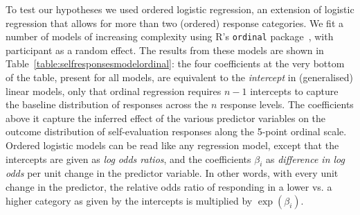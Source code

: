 To test our hypotheses we used ordered logistic regression, an extension of logistic regression that allows for more than two (ordered) response categories. We fit a number of models of increasing complexity using R's \texttt{ordinal} package~\citep{ordinal2015}, with participant as a random effect. %
The results from these models are shown in Table~\ref{table:selfresponsesmodelordinal}: the four coefficients at the very bottom of the table, present for all models, are equivalent to the \emph{intercept} in (generalised) linear models, only that ordinal regression requires $n-1$ intercepts to capture the baseline distribution of responses across the $n$ response levels. The coefficients above it capture the inferred effect of the various predictor variables on the outcome distribution of self-evaluation responses along the 5-point ordinal scale. Ordered logistic models can be read like any regression model, except that the intercepts are given as \emph{log odds ratios}, and the coefficients $\beta_i$ as \emph{difference in log odds} per unit change in the predictor variable. In other words, with every unit change in the predictor, the relative odds ratio of responding in a lower vs. a higher category as given by the intercepts is multiplied by $\exp(\beta_i)$.

